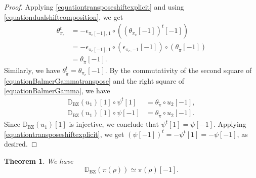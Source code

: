 \documentclass[a4paper,10pt]{amsart}
\newtheorem{theorem}{Theorem}[section]
\theoremstyle{remark}
\theoremstyle{definition}
\theoremstyle{plain}
\numberwithin{equation}{section}
\newcommand{\bbD}{{\mathbb D}}
\newcommand{\BZ}{\ensuremath{\mathrm{BZ}}}
\begin{document}
\begin{proof}
	Applying \eqref{equationtransposeshiftexplicit} and using \eqref{equationdualshiftcomposition}, we get
	\[
	\begin{aligned}
	\theta_{\pi_c}^t&=-\epsilon_{\pi_c[-1],1}\circ((\theta_{\pi_c}[-1])^t[-1])\\
	&=-\epsilon_{\pi_c[-1],1}\circ (\epsilon_{\pi_c,-1}[-1])\circ(\theta_{\widetilde{\pi}}[-1])\\
	&=\theta_{\widetilde{\pi}}[-1].
	\end{aligned}
	\]
	Similarly, we have $\theta_{\widetilde{\pi}}^t=\theta_{\pi_c}[-1]$. By the commutativity of the second square of \eqref{equationBalmerGammatranspose} and the right square of \eqref{equationBalmerGamma}, we have
	\begin{equation}\label{equationBalmerGammacomparison}
		\begin{aligned}
			\bbD_{\BZ}(u_1)[1]\circ\psi^t[1]&=\theta_{\widetilde{\pi}}\circ u_2[-1],\\
			\bbD_{\BZ}(u_1)[1]\circ\psi[-1]&=\theta_{\widetilde{\pi}}\circ u_2[-1].
		\end{aligned}
	\end{equation}
	Since $\bbD_{\BZ}(u_1)[1]$ is injective, we conclude that $\psi^t[1]=\psi[-1]$. Applying \eqref{equationtransposeshiftexplicit}, we get $(\psi[-1])^t=-\psi^t[1]=-\psi[-1]$, as desired.
\end{proof}
\begin{theorem}\label{theoremDBZpirho}
	We have 
	\[\bbD_{\BZ}(\pi(\rho))\simeq \pi(\rho)[-1].\]
\end{theorem}
\end{document}

